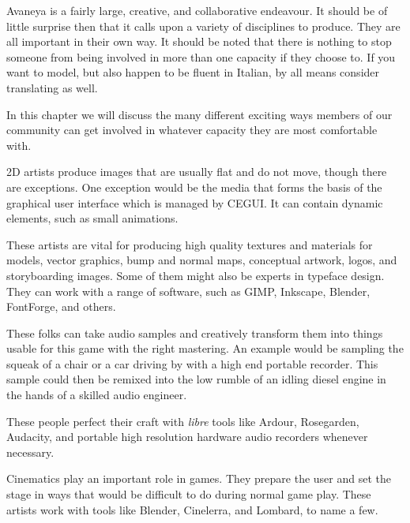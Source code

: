 
Avaneya is a fairly large, creative, and collaborative endeavour. It should be of little surprise then that it calls upon a variety of disciplines to produce. They are all important in their own way. It should be noted that there is nothing to stop someone from being involved in more than one capacity if they choose to. If you want to model, but also happen to be fluent in Italian, by all means consider translating as well.

In this chapter we will discuss the many different exciting ways members of our community can get involved in whatever capacity they are most comfortable with.


2D artists produce images that are usually flat and do not move, though there are exceptions. One exception would be the media that forms the basis of the graphical user interface which is managed by CEGUI. It can contain dynamic elements, such as small animations. 

These artists are vital for producing high quality textures and materials for models, vector graphics, bump and normal maps, conceptual artwork, logos, and storyboarding images. Some of them might also be experts in typeface design. They can work with a range of software, such as GIMP, Inkscape, Blender, FontForge, and others.


These folks can take audio samples and creatively transform them into things usable for this game with the right mastering. An example would be sampling the squeak of a chair or a car driving by with a high end portable recorder. This sample could then be remixed into the low rumble of an idling diesel engine in the hands of a skilled audio engineer. 

These people perfect their craft with {\it libre} tools like Ardour, Rosegarden, Audacity, and portable high resolution hardware audio recorders whenever necessary.


Cinematics play an important role in games. They prepare the user and set the stage in ways that would be difficult to do during normal game play. These artists work with tools like Blender, Cinelerra, and Lombard, to name a few.

